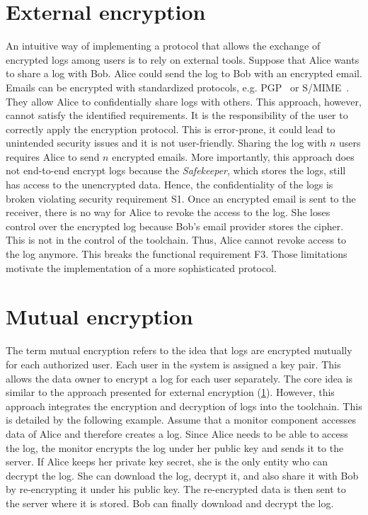 \documentclass[../main.tex]{subfiles}
\begin{document}
\section{External encryption}
\label{sec:external-encryption}
An intuitive way of implementing a protocol that allows the exchange of encrypted logs among users is to rely on external tools.
Suppose that Alice wants to share a log with Bob.
Alice could send the log to Bob with an encrypted email.
Emails can be encrypted with standardized protocols, e.g. PGP~\cite{OpenPGP2007} or S/MIME~\cite{SMIME2009}.
They allow Alice to confidentially share logs with others.
This approach, however, cannot satisfy the identified requirements.
It is the responsibility of the user to correctly apply the encryption protocol.
This is error-prone, it could lead to unintended security issues and it is not user-friendly.
Sharing the log with $n$ users requires Alice to send $n$ encrypted emails.
More importantly, this approach does not end-to-end encrypt logs because the \emph{Safekeeper}, which stores the logs, still has access to the unencrypted data.
Hence, the confidentiality of the logs is broken violating security requirement S1.
Once an encrypted email is sent to the receiver, there is no way for Alice to revoke the access to the log.
She loses control over the encrypted log because Bob's email provider stores the cipher.
This is not in the control of the toolchain.
Thus, Alice cannot revoke access to the log anymore.
This breaks the functional requirement F3.
Those limitations motivate the implementation of a more sophisticated protocol.

\section{Mutual encryption}
\label{sec:mutual-encryption}
The term mutual encryption refers to the idea that logs are encrypted mutually for each authorized user.
Each user in the system is assigned a key pair.
This allows the data owner to encrypt a log for each user separately.
The core idea is similar to the approach presented for external encryption (\cref{sec:external-encryption}).
However, this approach integrates the encryption and decryption of logs into the toolchain.
This is detailed by the following example.
Assume that a monitor component accesses data of Alice and therefore creates a log.
Since Alice needs to be able to access the log, the monitor encrypts the log under her public key and sends it to the server.
If Alice keeps her private key secret, she is the only entity who can decrypt the log.
She can download the log, decrypt it, and also share it with Bob by re-encrypting it under his public key.
The re-encrypted data is then sent to the server where it is stored.
Bob can finally download and decrypt the log.
\end{document}
